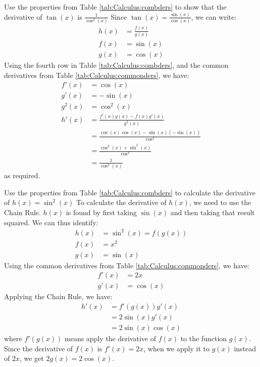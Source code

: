 \begin{example}{Use the properties from Table \ref{tab:Calculus:combders} to show that the derivative of $\tan(x)$ is $\frac{1}{\cos^2(x)}$}
Since $\tan(x)=\frac{\sin(x)}{\cos(x)}$, we can write:
\begin{align*}
h(x) &= \frac{f(x)}{g(x)} \\
f(x) &= \sin(x)\\
g(x) &= \cos(x)
\end{align*}
Using the fourth row in Table \ref{tab:Calculus:combders}, and the common derivatives from Table \ref{tab:Calculus:commonders}, we have:
\begin{align*}
f'(x) &= \cos(x) \\
g'(x) &= -\sin(x) \\
g^2(x) &= \cos^2(x) \\
h'(x) &=\frac{f'(x)g(x)-f(x)g'(x)}{g^2(x)}\\ 
&= \frac{\cos(x)\cos(x) - \sin(x) (-\sin(x))}{\cos^2}\\
&=\frac{\cos^2(x)+\sin^2(x)}{\cos^2}\\
&=\frac{1}{\cos^2(x)}
\end{align*}
as required.
\end{example}

\begin{example}{Use the properties from Table \ref{tab:Calculus:combders} to calculate the derivative of $h(x)=\sin^2(x)$}
To calculate the derivative of $h(x)$, we need to use the Chain Rule. $h(x)$ is found by first taking $\sin(x)$ and then taking that result squared. We can thus identify:
\begin{align*}
h(x) &= \sin^2(x) = f(g(x))\\
f(x) &= x^2 \\
g(x) &= \sin(x)
\end{align*}
Using the common derivatives from Table \ref{tab:Calculus:commonders}, we have:
\begin{align*}
f'(x) &= 2x \\
g'(x) &= \cos(x)
\end{align*}
Applying the Chain Rule, we have:
\begin{align*}
h'(x) &= f'(g(x))g'(x)\\
&= 2\sin(x)g'(x)\\
&= 2\sin(x)\cos(x)
\end{align*}
where $f'(g(x))$ means apply the derivative of $f(x)$ to the function $g(x)$. Since the derivative of $f(x)$ is $f'(x)=2x$, when we apply it to $g(x)$ instead of $2x$, we get $2g(x)=2\cos(x)$.
\end{example}

